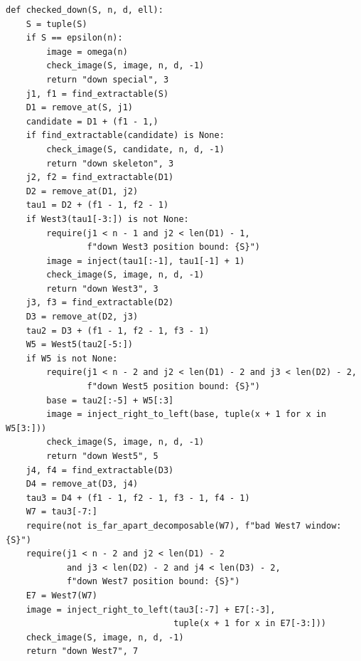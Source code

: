 \documentclass[11pt]{article}
\theoremstyle{plain}
\theoremstyle{definition}
\theoremstyle{remark}
\begin{document}
\begin{lstlisting}
def checked_down(S, n, d, ell):
    S = tuple(S)
    if S == epsilon(n):
        image = omega(n)
        check_image(S, image, n, d, -1)
        return "down special", 3
    j1, f1 = find_extractable(S)
    D1 = remove_at(S, j1)
    candidate = D1 + (f1 - 1,)
    if find_extractable(candidate) is None:
        check_image(S, candidate, n, d, -1)
        return "down skeleton", 3
    j2, f2 = find_extractable(D1)
    D2 = remove_at(D1, j2)
    tau1 = D2 + (f1 - 1, f2 - 1)
    if West3(tau1[-3:]) is not None:
        require(j1 < n - 1 and j2 < len(D1) - 1,
                f"down West3 position bound: {S}")
        image = inject(tau1[:-1], tau1[-1] + 1)
        check_image(S, image, n, d, -1)
        return "down West3", 3
    j3, f3 = find_extractable(D2)
    D3 = remove_at(D2, j3)
    tau2 = D3 + (f1 - 1, f2 - 1, f3 - 1)
    W5 = West5(tau2[-5:])
    if W5 is not None:
        require(j1 < n - 2 and j2 < len(D1) - 2 and j3 < len(D2) - 2,
                f"down West5 position bound: {S}")
        base = tau2[:-5] + W5[:3]
        image = inject_right_to_left(base, tuple(x + 1 for x in W5[3:]))
        check_image(S, image, n, d, -1)
        return "down West5", 5
    j4, f4 = find_extractable(D3)
    D4 = remove_at(D3, j4)
    tau3 = D4 + (f1 - 1, f2 - 1, f3 - 1, f4 - 1)
    W7 = tau3[-7:]
    require(not is_far_apart_decomposable(W7), f"bad West7 window: {S}")
    require(j1 < n - 2 and j2 < len(D1) - 2
            and j3 < len(D2) - 2 and j4 < len(D3) - 2,
            f"down West7 position bound: {S}")
    E7 = West7(W7)
    image = inject_right_to_left(tau3[:-7] + E7[:-3],
                                 tuple(x + 1 for x in E7[-3:]))
    check_image(S, image, n, d, -1)
    return "down West7", 7


\end{lstlisting}
\end{document}
